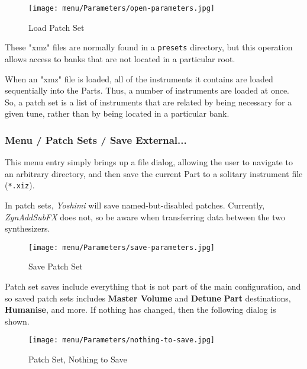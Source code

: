 \begin{figure}[H]
   \centering
   \texttt{[image: menu/Parameters/open-parameters.jpg]}
   \caption{Load Patch Set}
   \label{fig:yoshimi_menu_open_parameters}
\end{figure}

   These "xmz" files are normally found in a \texttt{presets} directory, but this
   operation allows access to banks that are not located in a particular root.

   When an "xmz" file is loaded, all of the instruments it contains are
   loaded sequentially into the Parts.  Thus, a number of instruments are loaded
   at once.  So, a patch set is a list of instruments that are related by
   being necessary for a given tune, rather than by being located in a
   particular bank.


\subsubsection{Menu / Patch Sets / Save External...}
\label{subsubsec:menu_patch_sets_save}

   This menu entry simply brings up a file dialog, allowing the user to
   navigate to an arbitrary directory, and then save the current Part
   to a solitary instrument file (\texttt{*.xiz}).

   In patch sets, \textsl{Yoshimi} will save named-but-disabled patches.
   Currently, \textsl{ZynAddSubFX} does not, so be aware when transferring
   data between the two synthesizers.

\begin{figure}[H]
   \centering
   \texttt{[image: menu/Parameters/save-parameters.jpg]}
   \caption{Save Patch Set}
   \label{fig:yoshimi_menu_save_parameters}
\end{figure}

   Patch set saves include everything that is not part of the main
   configuration, and so saved patch sets
   includes \textbf{Master Volume} and \textbf{Detune}
   \textbf{Part} destinations, \textbf{Humanise},
   and more.
   If nothing has changed, then the following dialog is shown.

\begin{figure}[H]
   \centering
   \texttt{[image: menu/Parameters/nothing-to-save.jpg]}
   \caption{Patch Set, Nothing to Save}
   \label{fig:yoshimi_menu_nothing_to_save_parameters}
\end{figure}

